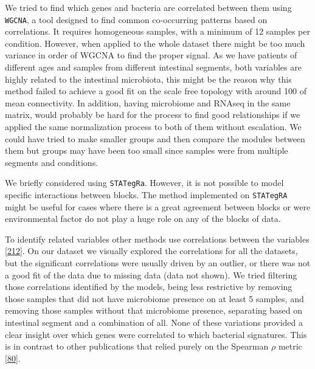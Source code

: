 \documentclass[
  12pt,
  a4paper,
  twoside,
  openright]{book}
\begin{document}
We tried to find which genes and bacteria are correlated between them using \texttt{WGCNA}, a tool designed to find common co-occurring patterns based on correlations.
It requires homogeneous samples, with a minimum of 12 samples per condition.
However, when applied to the whole dataset there might be too much variance in order of WGCNA to find the proper signal.
As we have patients of different ages and samples from different intestinal segments, both variables are highly related to the intestinal microbiota, this might be the reason why this method failed to achieve a good fit on the scale free topology with around 100 of mean connectivity.
In addition, having microbiome and RNAseq in the same matrix, would probably be hard for the process to find good relationships if we applied the same normalization process to both of them without escalation.
We could have tried to make smaller groups and then compare the modules between them but groups may have been too small since samples were from multiple segments and conditions.

We briefly considered using \texttt{STATegRa}.
However, it is not possible to model specific interactions between blocks.
The method implemented on \texttt{STATegRA} might be useful for cases where there is a great agreement between blocks or were environmental factor do not play a huge role on any of the blocks of data.

To identify related variables other methods use correlations between the variables {[}\protect\hyperlink{ref-vila-casadesuxfas2016}{212}{]}.
On our dataset we visually explored the correlations for all the datasets, but the significant correlations were usually driven by an outlier, or there was not a good fit of the data due to missing data (data not shown).
We tried filtering those correlations identified by the models, being less restrictive by removing those samples that did not have microbiome presence on at least 5 samples, and removing those samples without that microbiome presence, separating based on intestinal segment and a combination of all.
None of these variations provided a clear insight over which genes were correlated to which bacterial signatures.
This is in contrast to other publications that relied purely on the Spearman \(\rho\) metric {[}\protect\hyperlink{ref-hasler_uncoupling_2016}{80}{]}.
\end{document}
